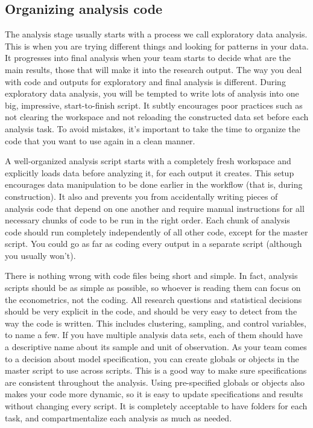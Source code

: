 \subsection{Organizing analysis code}

The analysis stage usually starts with a process we call exploratory data analysis.
This is when you are trying different things and looking for patterns in your data.
It progresses into final analysis when your team starts to decide what are the main results,
those that will make it into the research output.
The way you deal with code and outputs for exploratory and final analysis is different.
During exploratory data analysis,
you will be tempted to write lots of analysis into one big, impressive, start-to-finish script.
It subtly encourages poor practices such as not clearing the workspace and not reloading the constructed data set before each analysis task.
To avoid mistakes, it's important to take the time
to organize the code that you want to use again in a clean manner.

A well-organized analysis script starts with a completely fresh workspace
and explicitly loads data before analyzing it, for each output it creates.
This setup encourages data manipulation to be done earlier in the workflow
(that is, during construction).
It also and prevents you from accidentally writing pieces of analysis code that depend on one another
and require manual instructions for all necessary chunks of code to be run in the right order.
Each chunk of analysis code should run completely independently of all other code,
except for the master script.
You could go as far as coding every output in a separate script (although you usually won't).

There is nothing wrong with code files being short and simple.
In fact, analysis scripts should be as simple as possible,
so whoever is reading them can focus on the econometrics, not the coding.
All research questions and statistical decisions should be very explicit in the code,
and should be very easy to detect from the way the code is written.
This includes clustering, sampling, and control variables, to name a few.
If you have multiple analysis data sets,
each of them should have a descriptive name about its sample and unit of observation.
As your team comes to a decision about model specification,
you can create globals or objects in the master script to use across scripts.
This is a good way to make sure specifications are consistent throughout the analysis.
Using pre-specified globals or objects also makes your code more dynamic,
so it is easy to update specifications and results without changing every script.
It is completely acceptable to have folders for each task,
and compartmentalize each analysis as much as needed.

